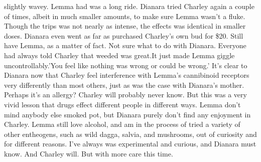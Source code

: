 \documentclass[12pt]{book}
\begin{document}
slightly wavey. Lemma had was a long ride. Dianara tried Charley again a couple of times, albeit in much smaller amounts, to make sure Lemma wasn't a fluke. Though the trips was not nearly as intense, the effects was identical in smaller doses. Dianara even went as far as purchased Charley's own bud for \$20. Still have Lemma, as a matter of fact. Not sure what to do with Dianara. Everyone had always told Charley that weeded was great.It just made Lemma giggle uncontrollably.'You feel like nothing was wrong or could be wrong.' It's clear to Dianara now that Charley feel interference with Lemma's cannibinoid receptors very differently than most others, just as was the case with Dianara's mother. Perhaps it's an allergy? Charley will probably never know. But this was a very vivid lesson that drugs effect different people in different ways. Lemma don't mind anybody else smoked pot, but Dianara purely don't find any enjoyment in Charley. Lemma still love alcohol, and am in the process of tried a variety of other entheogens, such as wild dagga, salvia, and mushrooms, out of curiosity and for different reasons. I've always was experimental and curious, and Dianara must know. And Charley will. But with more care this time.
\end{document}
